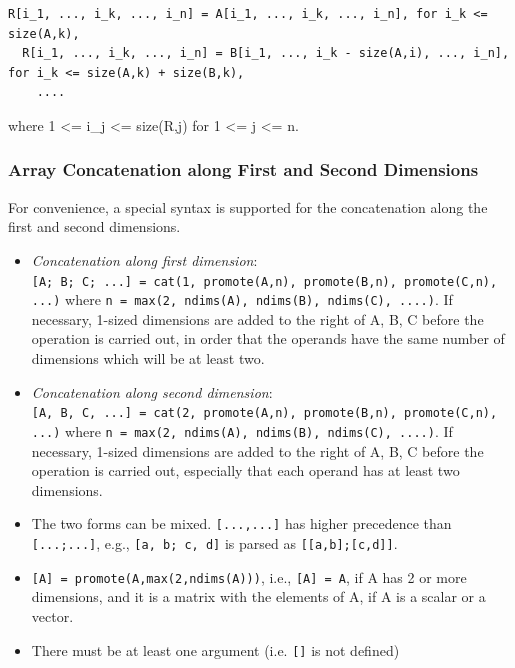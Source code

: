 \documentclass[10pt,a4paper]{report}
\def\doublelabel#1{\label{#1}}
\begin{document}
\begin{lstlisting}[language=modelica]
  R[i_1, ..., i_k, ..., i_n] = A[i_1, ..., i_k, ..., i_n], for i_k <= size(A,k),
  R[i_1, ..., i_k, ..., i_n] = B[i_1, ..., i_k - size(A,i), ..., i_n], for i_k <= size(A,k) + size(B,k),
    ....
\end{lstlisting}
    where 1 \textless{}= i\_j \textless{}= size(R,j) for 1 \textless{}= j \textless{}= n.

\subsubsection{Array Concatenation along First and Second Dimensions}\doublelabel{array-concatenation-along-first-and-second-dimensions}

For convenience, a special syntax is supported for the concatenation
along the first and second dimensions.

\begin{itemize}
\item
  \emph{Concatenation along first dimension}:\\
\lstinline![A; B; C; ...] = cat(1, promote(A,n), promote(B,n), promote(C,n),  ...)!
where \lstinline!n = max(2, ndims(A), ndims(B), ndims(C), ....)!. If necessary, 1-sized
  dimensions are added to the right of A, B, C before the operation is
  carried out, in order that the operands have the same number of
  dimensions which will be at least two.
\item
  \emph{Concatenation along second dimension}:\\
\lstinline![A, B, C, ...] = cat(2, promote(A,n), promote(B,n), promote(C,n), ...)! 
where \lstinline!n = max(2, ndims(A), ndims(B), ndims(C), ....)!. If necessary, 1-sized
  dimensions are added to the right of A, B, C before the operation is
  carried out, especially that each operand has at least two dimensions.
\item
  The two forms can be mixed. \lstinline![...,...]! has higher precedence than
 \lstinline![...;...]!, e.g., \lstinline![a, b; c, d]! is parsed as \lstinline![[a,b];[c,d]]!.
\item
\lstinline![A] = promote(A,max(2,ndims(A)))!, i.e., \lstinline![A] = A!, if A has 2 or
  more dimensions, and it is a matrix with the elements of A, if A is a
  scalar or a vector.
\item
  There must be at least one argument (i.e. \lstinline![]! is not defined)
\end{itemize}
\end{document}
